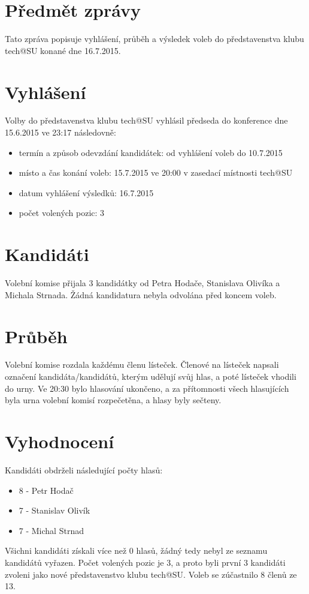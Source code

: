 \documentclass[10pt]{article}
\begin{document}
\section{Předmět zprávy}
	Tato zpráva popisuje vyhlášení, průběh a výsledek voleb do představenstva klubu tech@SU konané dne 16.7.2015.

\section{Vyhlášení}
	Volby do představenstva klubu tech@SU vyhlásil předseda do konference dne 15.6.2015 ve 23:17 následovně:
		\begin{itemize}
			\item termín a způsob odevzdání kandidátek: od vyhlášení voleb do 10.7.2015 
			\item místo a čas konání voleb: 15.7.2015 ve 20:00 v zasedací místnosti tech@SU
			\item datum vyhlášení výsledků: 16.7.2015
			\item počet volených pozic: 3
		\end{itemize}

\section{Kandidáti}
	Volební komise přijala 3 kandidátky od Petra Hodače, Stanislava Olivíka a Michala Strnada. Žádná kandidatura nebyla odvolána před koncem voleb.
	
\section{Průběh}
	Volební komise rozdala každému členu lísteček. Členové na lísteček napsali označení kandidáta/kandidátů, kterým udělují svůj hlas, a poté lísteček vhodili do urny. Ve 20:30 bylo hlasování ukončeno, a za přítomnosti všech hlasujících byla urna volební komisí rozpečetěna, a hlasy byly sečteny.

\section{Vyhodnocení}
	Kandidáti obdrželi následující počty hlasů:
	\begin{itemize}
		\item 8 - Petr Hodač
		\item 7 - Stanislav Olivík
		\item 7 - Michal Strnad
	\end{itemize}
	Všichni kandidáti získali více než 0 hlasů, žádný tedy nebyl ze seznamu kandidátů vyřazen. Počet volených pozic je 3, a proto byli první 3 kandidáti zvoleni jako nové představenstvo klubu tech@SU.
	Voleb se zúčastnilo 8 členů ze 13.
\end{document}
